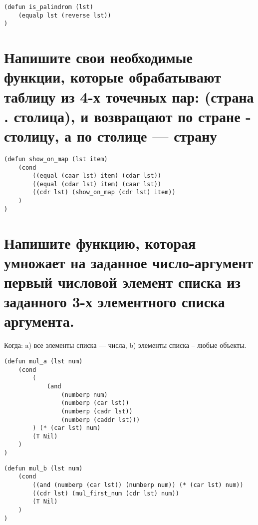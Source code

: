 \documentclass[a4paper, 14pt, unknownkeysallowed]{extreport}
\begin{document}
\begin{lstlisting}
(defun is_palindrom (lst)
	(equalp lst (reverse lst))
)
\end{lstlisting} 


\section{Напишите свои необходимые функции, которые обрабатывают таблицу из
	4-х точечных пар:
	(страна . столица), и возвращают по стране - столицу, а по столице — 
	страну}

\begin{lstlisting}
(defun show_on_map (lst item)
	(cond
		((equal (caar lst) item) (cdar lst))
		((equal (cdar lst) item) (caar lst))
		((cdr lst) (show_on_map (cdr lst) item))
	)
)
\end{lstlisting}
\clearpage
\section{Напишите функцию, которая умножает на заданное число-аргумент 
первый числовой элемент списка из заданного 3-х элементного списка аргумента.}
Когда:
a) все элементы списка --- числа,
b) элементы списка -- любые объекты.

\begin{lstlisting}
(defun mul_a (lst num)
	(cond
		(
			(and
				(numberp num)
				(numberp (car lst))
				(numberp (cadr lst))
				(numberp (caddr lst)))
		) (* (car lst) num)
		(T Nil)
	)
)
\end{lstlisting}


\begin{lstlisting}
(defun mul_b (lst num)
	(cond
		((and (numberp (car lst)) (numberp num)) (* (car lst) num))
		((cdr lst) (mul_first_num (cdr lst) num))
		(T Nil)
	)
)
\end{lstlisting}
\end{document}
